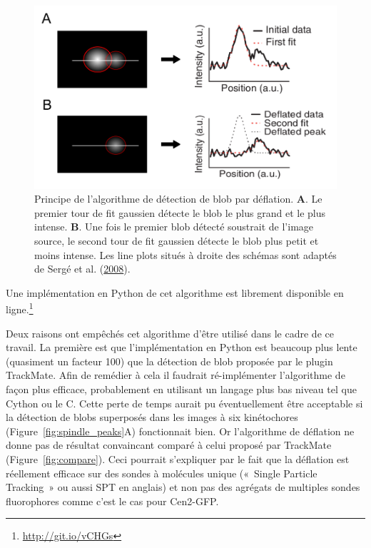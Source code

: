 \documentclass[12pt,a4paper,twoside,openright]{book}
\begin{document}
\begin{figure}[htbp]
\centering
\includegraphics{figures/results/imaging/deflation.png}
\caption[Principe de l'algorithme de détection de blob par déflation]{\label{fig:deflation}Principe
de l'algorithme de détection de blob par déflation. \textbf{A}. Le
premier tour de fit gaussien détecte le blob le plus grand et le plus
intense. \textbf{B}. Une fois le premier blob détecté soustrait de
l'image source, le second tour de fit gaussien détecte le blob plus
petit et moins intense. Les line plots situés à droite des schémas sont
adaptés de Sergé et al. (\protect\hyperlink{ref-Serge2008}{2008}).}
\end{figure}

Une implémentation en Python de cet algorithme est librement disponible
en ligne.\footnote{\url{http://git.io/vCHGs}}

Deux raisons ont empêchés cet algorithme d'être utilisé dans le cadre de
ce travail. La première est que l'implémentation en Python est beaucoup
plus lente (quasiment un facteur 100) que la détection de blob proposée
par le plugin TrackMate. Afin de remédier à cela il faudrait
ré-implémenter l'algorithme de façon plus efficace, probablement en
utilisant un langage plus bas niveau tel que Cython ou le C. Cette perte
de temps aurait pu éventuellement être acceptable si la détection de
blobs superposés dans les images à six kinétochores
(Figure~\ref{fig:spindle_peaks}A) fonctionnait bien. Or l'algorithme de
déflation ne donne pas de résultat convaincant comparé à celui proposé
par TrackMate (Figure~\ref{fig:compare}). Ceci pourrait s'expliquer par
le fait que la déflation est réellement efficace sur des sondes à
molécules unique («~Single Particle Tracking~» ou aussi SPT en anglais)
et non pas des agrégats de multiples sondes fluorophores comme c'est le
cas pour Cen2-GFP.
\end{document}
